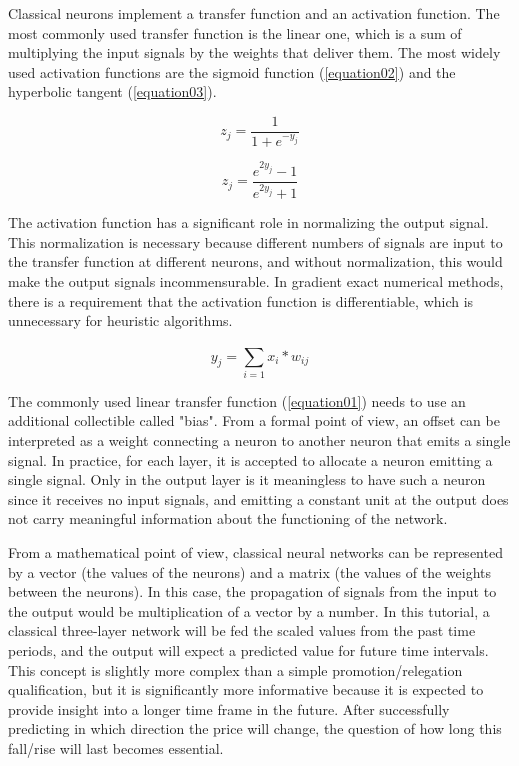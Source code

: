 Classical neurons implement a transfer function and an activation function. The most commonly used transfer function is the linear one, which is a sum of multiplying the input signals by the weights that deliver them. The most widely used activation functions are the sigmoid function (\ref{equation02}) and the hyperbolic tangent (\ref{equation03}).

\begin{equation}
\label{equation02}
z_{j} = \frac{1}{1 + e^{-y_{j}}}
\end{equation}

\begin{equation}
\label{equation03}
z_{j} = \frac{e^{2y_{j}}-1}{e^{2y_{j}}+1}
\end{equation}

The activation function has a significant role in normalizing the output signal. This normalization is necessary because different numbers of signals are input to the transfer function at different neurons, and without normalization, this would make the output signals incommensurable. In gradient exact numerical methods, there is a requirement that the activation function is differentiable, which is unnecessary for heuristic algorithms.

\begin{equation}
\label{equation01}
y_{j} = \sum_{i=1}^{} x_{i}*w_{ij}
\end{equation}

The commonly used linear transfer function (\ref{equation01}) needs to use an additional collectible called "bias". From a formal point of view, an offset can be interpreted as a weight connecting a neuron to another neuron that emits a single signal. In practice, for each layer, it is accepted to allocate a neuron emitting a single signal. Only in the output layer is it meaningless to have such a neuron since it receives no input signals, and emitting a constant unit at the output does not carry meaningful information about the functioning of the network.

From a mathematical point of view, classical neural networks can be represented by a vector (the values of the neurons) and a matrix (the values of the weights between the neurons). In this case, the propagation of signals from the input to the output would be multiplication of a vector by a number. In this tutorial, a classical three-layer network will be fed the scaled values from the past time periods, and the output will expect a predicted value for future time intervals. This concept is slightly more complex than a simple promotion/relegation qualification, but it is significantly more informative because it is expected to provide insight into a longer time frame in the future. After successfully predicting in which direction the price will change, the question of how long this fall/rise will last becomes essential.

